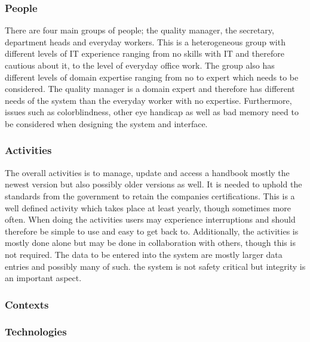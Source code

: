 \subsubsection*{People}

There are four main groups of people; the quality manager, the secretary, department heads and everyday workers.
This is a heterogeneous group with different levels of IT experience ranging from no skills with IT and therefore cautious about it, to the level of everyday office work.
The group also has different levels of domain expertise ranging from no to expert which needs to be considered. The quality manager is a domain expert and therefore has different needs of the system than the everyday worker with no expertise.
\newline
Furthermore, issues such as colorblindness, other eye handicap as well as bad memory need to be considered when designing the system and interface.


\subsubsection*{Activities}
The overall activities is to manage, update and access a handbook mostly the newest version but also possibly older versions as well. It is needed to uphold the standards from the government to retain the companies certifications.
This is a well defined activity
which takes place at least yearly, though sometimes more often.
When doing the activities users may experience interruptions and should therefore be simple to use and easy to get back to.
Additionally, the activities is mostly done alone but may be done in collaboration with others, though this is not required.
\newline
The data to be entered into the system are mostly larger data entries and possibly many of such.
the system is not safety critical but integrity is an important aspect.

\subsubsection*{Contexts}


\subsubsection*{Technologies}














